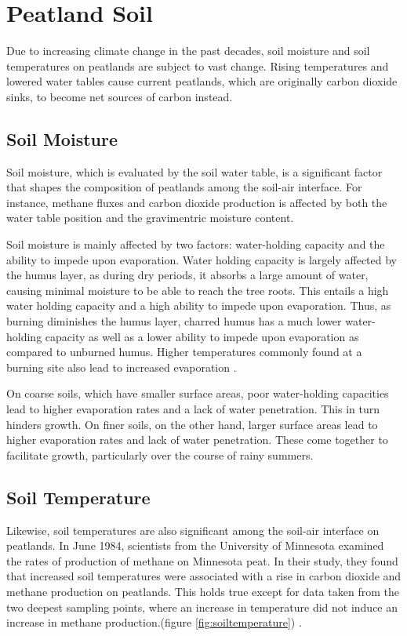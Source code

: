 \section{Peatland Soil}

Due to increasing climate change in the past decades, soil moisture and soil temperatures on peatlands are subject to vast change. Rising temperatures and lowered water tables cause current peatlands, which are originally carbon dioxide sinks, to become net sources of carbon instead.

\subsection{Soil Moisture}

Soil moisture, which is evaluated by the soil water table, is a significant factor that shapes the composition of peatlands among the soil-air interface. For instance, methane fluxes and carbon dioxide production is affected by both the water table position and the gravimentric moisture content.

Soil moisture is mainly affected by two factors: water-holding capacity and the ability to impede upon evaporation. Water holding capacity is largely affected by the humus layer, as during dry periods, it absorbs a large amount of water, causing minimal moisture to be able to reach the tree roots. This entails a high water holding capacity and a high ability to impede upon evaporation. Thus, as burning diminishes the humus layer, charred humus has a much lower water-holding capacity as well as a lower ability to impede upon evaporation as compared to unburned humus. Higher temperatures commonly found at a burning site also lead to increased evaporation \citep{kozlowski2012fire}.

On coarse soils, which have smaller surface areas, poor water-holding capacities lead to higher evaporation rates and a lack of water penetration. This in turn hinders growth. On finer soils, on the other hand, larger surface areas lead to higher evaporation rates and lack of water penetration. These come together to facilitate growth, particularly over the course of rainy summers.

\subsection{Soil Temperature}

Likewise, soil temperatures are also significant among the soil-air interface on peatlands. In June 1984, scientists from the University of Minnesota examined the rates of production of methane on Minnesota peat. In their study, they found that increased soil temperatures were associated with a rise in carbon dioxide and methane production on peatlands. This holds true except for data taken from the two deepest sampling points, where an increase in temperature did not induce an increase in methane production.(figure \ref{fig:soiltemperature}) \citep{williams1984methane}.

